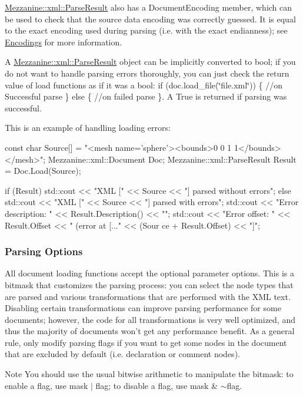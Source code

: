 \hyperlink{structMezzanine_1_1xml_1_1ParseResult}{Mezzanine::xml::ParseResult} also has a DocumentEncoding member, which can be used to check that the source data encoding was correctly guessed. It is equal to the exact encoding used during parsing (i.e. with the exact endianness); see \hyperlink{XMLManual_XMLLoadingEncodings}{Encodings} for more information. \par
 \par
 A \hyperlink{structMezzanine_1_1xml_1_1ParseResult}{Mezzanine::xml::ParseResult} object can be implicitly converted to bool; if you do not want to handle parsing errors thoroughly, you can just check the return value of load functions as if it was a bool: if (doc.load\_\-file(\char`\"{}file.xml\char`\"{})) \{ //on Successful parse \} else \{ //on failed parse \}. A True is returned if parsing was successful. \par
 \par
 This is an example of handling loading errors: 
\begin{DoxyCode}
 const char Source[] = "<mesh name='sphere'><bounds>0 0 1 1</bounds></mesh>";
 Mezzanine::xml::Document Doc;
 Mezzanine::xml::ParseResult Result = Doc.Load(Source);

 if (Result)
     std::cout << "XML [" << Source << "] parsed without errors\n\n";
 else
 {
     std::cout << "XML [" << Source << "] parsed with errors\n";
     std::cout << "Error description: " << Result.Description() << "\n";
     std::cout << "Error offset: " << Result.Offset << " (error at [..." << (Sour
      ce + Result.Offset) << "]\n\n";
 }
\end{DoxyCode}
 \hypertarget{XMLManual_XMLLoadingParsingOptions}{}\subsubsection{Parsing Options}\label{XMLManual_XMLLoadingParsingOptions}
All document loading functions accept the optional parameter options. This is a bitmask that customizes the parsing process: you can select the node types that are parsed and various transformations that are performed with the XML text. Disabling certain transformations can improve parsing performance for some documents; however, the code for all transformations is very well optimized, and thus the majority of documents won't get any performance benefit. As a general rule, only modify parsing flags if you want to get some nodes in the document that are excluded by default (i.e. declaration or comment nodes). \begin{DoxyNote}{Note}
You should use the usual bitwise arithmetic to manipulate the bitmask: to enable a flag, use mask $|$ flag; to disable a flag, use mask \& $\sim$flag.
\end{DoxyNote}

